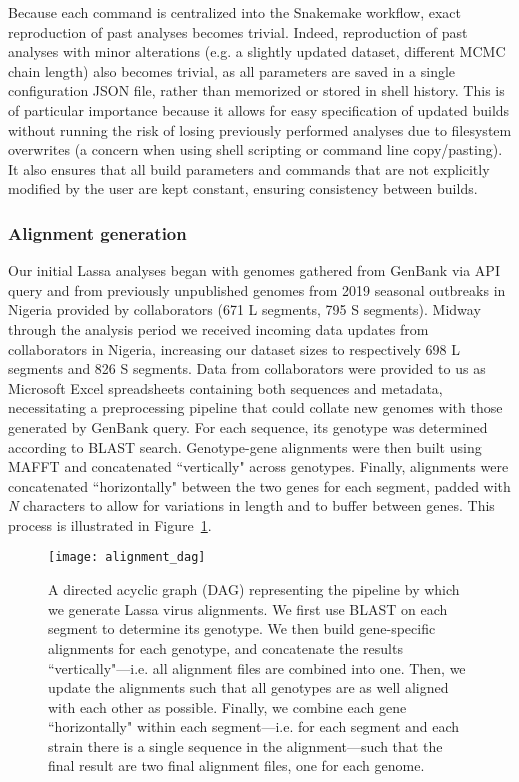Because each command is centralized into the Snakemake workflow, exact reproduction of past analyses becomes trivial.
Indeed, reproduction of past analyses with minor alterations (e.g. a slightly updated dataset, different MCMC chain length) also becomes trivial, as all parameters are saved in a single configuration JSON file, rather than memorized or stored in shell history.
This is of particular importance because it allows for easy specification of updated builds without running the risk of losing previously performed analyses due to filesystem overwrites (a concern when using shell scripting or command line copy/pasting).
It also ensures that all build parameters and commands that are not explicitly modified by the user are kept constant, ensuring consistency between builds.

\subsubsection{Alignment generation}

Our initial Lassa analyses began with genomes gathered from GenBank via API query and from previously unpublished genomes from 2019 seasonal outbreaks in Nigeria provided by collaborators (671 L segments, 795 S segments)\cite{liana2019}. %
Midway through the analysis period we received incoming data updates from collaborators in Nigeria, increasing our dataset sizes to respectively 698 L segments and 826 S segments.
Data from collaborators were provided to us as Microsoft Excel spreadsheets containing both sequences and metadata, necessitating a preprocessing pipeline that could collate new genomes with those generated by GenBank query.
For each sequence, its genotype was determined according to BLAST search.
Genotype-gene alignments were then built using MAFFT and concatenated ``vertically" across genotypes\cite{mafft}. %
Finally, alignments were concatenated ``horizontally" between the two genes for each segment, padded with \textit{N} characters to allow for variations in length and to buffer between genes.
This process is illustrated in Figure~\ref{fig:alignment_dag}.

\begin{figure}[ht]
  \centering
  \medskip
  \texttt{[image: alignment\_dag]}
  \caption[Lassa alignment pipeline]{A directed acyclic graph (DAG) representing the pipeline by which we generate Lassa virus alignments. We first use BLAST on each segment to determine its genotype. We then build gene-specific alignments for each genotype, and concatenate the results ``vertically"---i.e. all alignment files are combined into one. Then, we update the alignments such that all genotypes are as well aligned with each other as possible. Finally, we combine each gene ``horizontally" within each segment---i.e. for each segment and each strain there is a single sequence in the alignment---such that the final result are two final alignment files, one for each genome.}
  \label{fig:alignment_dag}
\end{figure}

